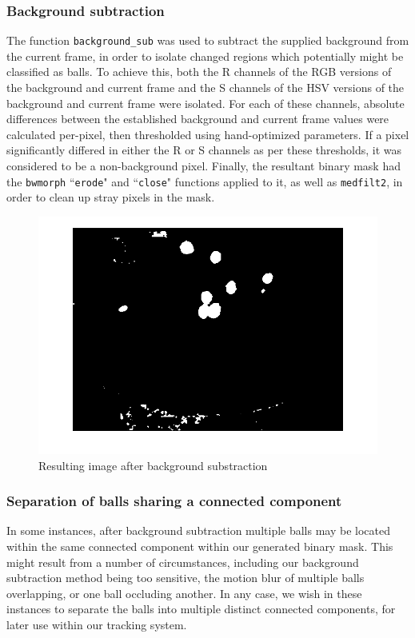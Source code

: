 \documentclass[12pt,a4paper]{article}
\begin{document}
\subsubsection{Background subtraction}
The function \texttt{background\_sub} was used to subtract the supplied background from the current frame, in order to isolate changed regions which potentially might be classified as balls. To achieve this, both the R channels of the RGB versions of the background and current frame and the S channels of the HSV versions of the background and current frame were isolated. For each of these channels, absolute differences between the established background and current frame values were calculated per-pixel, then thresholded using hand-optimized parameters. If a pixel significantly differed in either the R or S channels as per these thresholds, it was considered to be a non-background pixel. Finally, the resultant binary mask had the \texttt{bwmorph} ``\texttt{erode}" and ``\texttt{close}" functions applied to it, as well as \texttt{medfilt2}, in order to clean up stray pixels in the mask. 
\begin{figure}
	\centering
    \includegraphics[width=140mm]{frame_35_imgs/background_sub.png}
    \caption{Resulting image after background substraction}
	\label{my-label0}
\end{figure}

\subsubsection{Separation of balls sharing a connected component}
In some instances, after background subtraction multiple balls may be located within the same connected component within our generated binary mask. This might result from a number of circumstances, including our background subtraction method being too sensitive, the motion blur of multiple balls overlapping, or one ball occluding another. In any case, we wish in these instances to separate the balls into multiple distinct connected components, for later use within our tracking system. 
\end{document}
